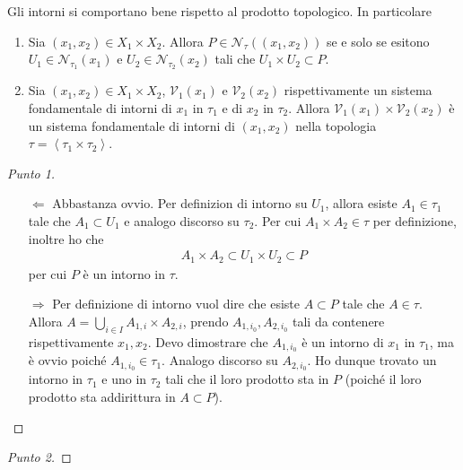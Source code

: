 \begin{theorem}
	Gli intorni si comportano bene rispetto al prodotto topologico. In particolare
	\begin{enumerate}
		\item Sia $(x_1, x_2) \in X_1\times X_2$. Allora $P \in \mathcal{N}_\tau((x_1,x_2))$ se e solo se esitono $U_1 \in \mathcal{N}_{\tau_1}(x_1)$ e $U_2 \in \mathcal{N}_{\tau_2}(x_2)$ tali che $U_1\times U_2 \subset P$.
		\item Sia $(x_1, x_2) \in X_1\times X_2$, $\mathcal{V}_1(x_1)$ e $\mathcal{V}_2(x_2)$ rispettivamente un sistema fondamentale di intorni di $x_1$ in $\tau_1$ e di $x_2$ in $\tau_2$. Allora $\mathcal{V}_1(x_1) \times \mathcal{V}_2(x_2)$ è un sistema fondamentale di intorni di $(x_1, x_2)$ nella topologia $\tau = \left\langle \tau_1 \times \tau_2 \right\rangle$.
	\end{enumerate}	
\end{theorem}
\begin{proof}[Punto 1]
	\begin{enumerate}
		\item[$\Leftarrow$] Abbastanza ovvio. Per definizion di intorno su $U_1$, allora esiste $A_1 \in \tau_1$ tale che $A_1 \subset U_1$ e analogo discorso su $\tau_2$. Per cui $A_1 \times A_2 \in \tau$ per definizione, inoltre ho che 
		\begin{equation}
		\begin{aligned}
			A_1 \times A_2 \subset U_1 \times U_2 \subset P
		\end{aligned}
		\end{equation}
		per cui $P$ è un intorno in $\tau$.
		\item[$\Rightarrow$] Per definizione di intorno vuol dire che esiste $A \subset P$ tale che $A \in \tau$. Allora $A = \bigcup_{i \in I} A_{1,i} \times A_{2,i}$, prendo $A_{1,i_0}, A_{2,i_0}$ tali da contenere rispettivamente $x_1, x_2$. Devo dimostrare che $A_{1,i_0}$ è un intorno di $x_1$ in $\tau_1$, ma è ovvio poiché $A_{1,i_0} \in \tau_1$. Analogo discorso su $A_{2,i_0}$. Ho dunque trovato un intorno in $\tau_1$ e uno in $\tau_2$ tali che il loro prodotto sta in $P$ (poiché il loro prodotto sta addirittura in $A \subset P$).
	\end{enumerate}
\end{proof}
\begin{proof}[Punto 2]
	\end{proof}


